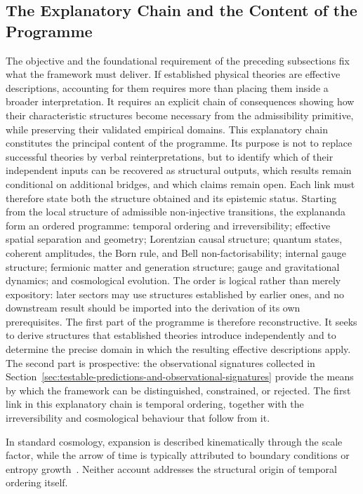 \subsection{The Explanatory Chain and the Content of the Programme}
  \label{subsec:time-irreversibility-and-cosmological-expansion}

  The objective and the foundational requirement of the preceding subsections fix
  what the framework must deliver.
  If established physical theories are effective descriptions, accounting for them
  requires more than placing them inside a broader interpretation.
  It requires an explicit chain of consequences showing how their characteristic
  structures become necessary from the admissibility primitive, while preserving
  their validated empirical domains.
  This explanatory chain constitutes the principal content of the programme.
  Its purpose is not to replace successful theories by verbal reinterpretations, but
  to identify which of their independent inputs can be recovered as structural
  outputs, which results remain conditional on additional bridges, and which claims
  remain open.
  Each link must therefore state both the structure obtained and its epistemic
  status.
  Starting from the local structure of admissible non-injective transitions, the
  explananda form an ordered programme: temporal ordering and irreversibility;
  effective spatial separation and geometry; Lorentzian causal structure; quantum
  states, coherent amplitudes, the Born rule, and Bell non-factorisability; internal
  gauge structure; fermionic matter and generation structure; gauge and
  gravitational dynamics; and cosmological evolution.
  The order is logical rather than merely expository: later sectors may use
  structures established by earlier ones, and no downstream result should be
  imported into the derivation of its own prerequisites.
  The first part of the programme is therefore reconstructive.
  It seeks to derive structures that established theories introduce independently
  and to determine the precise domain in which the resulting effective descriptions
  apply.
  The second part is prospective: the observational signatures collected in
  Section~\ref{sec:testable-predictions-and-observational-signatures} provide the
  means by which the framework can be distinguished, constrained, or rejected.
  The first link in this explanatory chain is temporal ordering, together with the
  irreversibility and cosmological behaviour that follow from it.

  In standard cosmology, expansion is described kinematically through the scale
  factor, while the arrow of time is typically attributed to boundary conditions
  or entropy
  growth~\cite{peebles1993principles,Prigogine1997,penrose1989emperors}.
  Neither account addresses the structural origin of temporal ordering itself.

